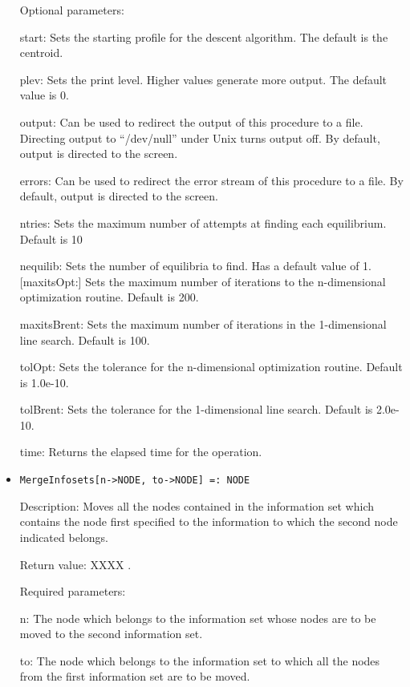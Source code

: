 \begin{itemize}
\item
[Optional parameters:]\hfil\null

\bd
\item
[start:] Sets the starting profile for the descent algorithm.  The
default is the centroid.
\item
[plev:] Sets the print level.  Higher values generate more output.
The default value is 0.
\item
[output:] Can be used to redirect the output of this procedure to a
file.  Directing output to ``/dev/null'' under Unix turns output off.
By default, output is directed to the screen.
\item
[errors:] Can be used to redirect the error stream of this procedure
to a file.  By default, output is directed to the screen.
\item
[ntries:] Sets the maximum number of attempts at finding each
equilibrium. Default is 10
\item
[nequilib:] Sets the number of equilibria to find.  Has a default
value of 1.  [maxitsOpt:] Sets the maximum number of iterations to the
n-dimensional optimization routine.  Default is 200.
\item
[maxitsBrent:] Sets the maximum number of iterations in the
1-dimensional line search.  Default is 100.
\item
[tolOpt:] Sets the tolerance for the n-dimensional optimization
routine.  Default is 1.0e-10.
\item
[tolBrent:] Sets the tolerance for the 1-dimensional line search.
Default is 2.0e-10.
\item
[time:] Returns the elapsed time for the operation.
\ed
\ed

\item
\protect \large \begin{verbatim}
MergeInfosets[n->NODE, to->NODE] =: NODE
\end{verbatim}\normalsize

\bd
\item
[Description:] Moves all the nodes contained in the information set
which contains the node first specified to the information to which
the second node indicated belongs.
\item
[Return value:] XXXX .
\item
[Required parameters:]\hfil\null

\bd
\item
[n:] The node which belongs to the information set whose nodes are to
be moved to the second information set.
\item
[to:] The node which belongs to the information set to which all the
nodes from the first information set are to be moved.
\ed


\end{itemize}
